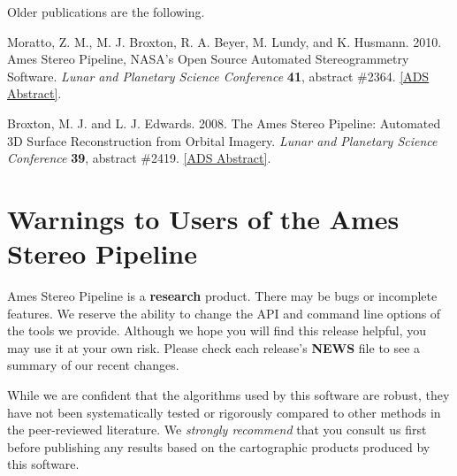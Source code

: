 Older publications are the following.

\begin{description}
\item Moratto, Z. M., M. J. Broxton, R. A. Beyer, M. Lundy, and K. Husmann.
2010. Ames Stereo Pipeline, NASA's Open Source Automated Stereogrammetry
Software. \textit{Lunar and Planetary Science Conference} \textbf{41},
abstract \#2364.
\href{http://adsabs.harvard.edu/abs/2010LPI....41.2364M}{[ADS Abstract]}.

\item Broxton, M. J. and L. J. Edwards. 2008. The Ames Stereo Pipeline:
Automated 3D Surface Reconstruction from Orbital Imagery. \textit{Lunar
and Planetary Science Conference} \textbf{39}, abstract \#2419.
\href{http://adsabs.harvard.edu/abs/2008LPI....39.2419B}{[ADS Abstract]}.
\end{description}

\section{Warnings to Users of the Ames Stereo Pipeline}

Ames Stereo Pipeline is a {\bf research} product. There may be bugs or
incomplete features. We reserve the ability to change the API and
command line options of the tools we provide. Although we hope you will
find this release helpful, you may use it at your own risk. Please check
each release's {\bf NEWS} file to see a summary of our recent changes.

While we are confident that the algorithms used by this software are
robust, they have not been systematically tested or rigorously
compared to other methods in the peer-reviewed literature. We {\it
strongly recommend} that you consult us first before publishing
any results based on the cartographic products produced by this software.
